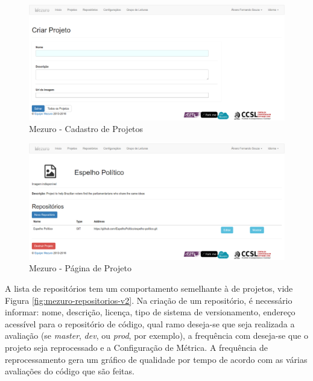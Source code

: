 \begin{figure}[!htb]
	\centering
    \includegraphics[keepaspectratio=true,scale=0.3]
    {figuras/mezuro-projeto-cadastro.eps}
  \caption{Mezuro - Cadastro de Projetos}
	\label{fig:mezuro-projeto-cadastro}
\end{figure}

\newpage

\begin{figure}[!htb]
	\centering
    \includegraphics[keepaspectratio=true,scale=0.3]
    {figuras/mezuro-projeto-view.eps}
  \caption{Mezuro - Página de Projeto}
	\label{fig:mezuro-projeto-view}
\end{figure}

\newpage

A lista de repositórios tem um comportamento semelhante à de projetos, vide
Figura \ref{fig:mezuro-repositorios-v2}. Na criação de um repositório, é
necessário informar: nome, descrição, licença, tipo de sistema de
versionamento, endereço acessível para o repositório de código, qual ramo
deseja-se que seja realizada a avaliação (se \textit{master},
\textit{dev}, ou \textit{prod}, por exemplo), a frequência com deseja-se que o
projeto seja reprocessado e a Configuração de Métrica. A frequência de
reprocessamento gera um gráfico de qualidade por tempo de acordo com as várias
avaliações do código que são feitas.

